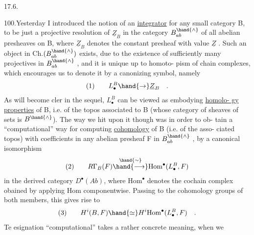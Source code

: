 
17.6.

100.\quad Yesterday I introduced the notion of an \uline{integrator} for any small
category B, to be just a projective resolution of $\underline{Z}_B$ in the category $B^{\hand{\wedge}}_{ab}$
of all abelian presheaves on B, where $\underline{Z}_B$ denotes the constant presheaf
with value $\underline{Z}$ . Such an object in Ch.$(B^{\hand{\wedge}}_{ab})$ exists, due to the existence
of sufficiently many projectives in $B^{\hand{\wedge}}_{ab}$ , and it is unique up to homoto-%
pism of  chain complexes, which encourages us to denote it by a canonizing
symbol, namely
\[ (1) \qquad L^{B}_{\bullet} \hand{\to} \underline{Z}_B \quad . \]
As will become cler in the sequel, $L^{B}_{\bullet}$ can be viewed as embodying \uline{homolo-%
gy properties} of B, i.e. of the topos associated to B (whose category of
sheaves of sets is $B^{\hand{\wedge}}$). The way we hit upon it though was in order to ob-%
tain a ``computational'' way for computing \uline{cohomology} of B (i.e. of the asso-%
ciated topos) with coefficients in any abelian  presheaf F in $B^{\hand{\wedge}}_{ab}$ ,
by a canonical isomorphism
\[ (2) \qquad R\Gamma_B(F) \overset{\hand{\sim}}{\hand{\longrightarrow}} \mathrm{Hom}^{\bullet}(L^{B}_{\bullet}, F) \]
in the derived category $D^{\bullet}(Ab)$, where $\mathrm{Hom}^{\bullet}$ denotes the cochain complex
obained by applying Hom componentwise. Passing to the cohomology groups
of both members, this gives rise to
\[ (3) \qquad H^{i}(B,F) \hand{\simeq} H^{i}\mathrm{Hom}^{\bullet}(L^{B}_{\bullet} , F) \quad . \]
Te esignation ``computational'' takes a rather concrete meaning, when we
